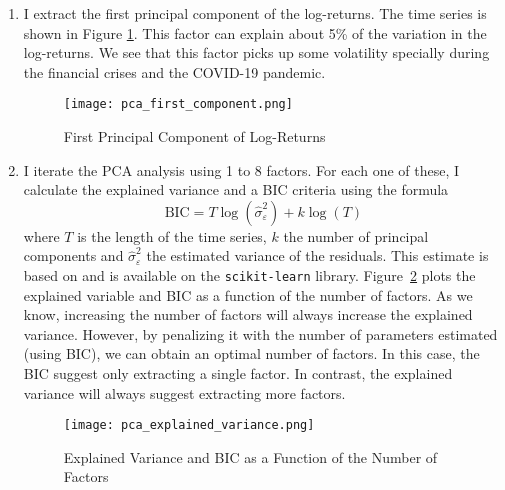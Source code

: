 \begin{solution}
    \begin{enumerate}[label = \Alph*)]
        \item I extract the first principal component of the log-returns. The time series is shown in Figure \ref{fig:pca_time_series}. This factor can explain about 5\% of the variation in the log-returns. We see that this factor picks up some volatility specially during the financial crises and the COVID-19 pandemic.
        
        \begin{figure}[!htbp]
            \begin{small}
                \begin{center}
                    \texttt{[image: pca\_first\_component.png]}
                \end{center}
                \caption{First Principal Component of Log-Returns}
                \label{fig:pca_time_series}
            \end{small}
        \end{figure}
        
        \item I iterate the PCA analysis using 1 to 8 factors. For each one of these, I calculate the explained variance and a BIC criteria using the formula
        \begin{equation}
            \text{BIC} = T\log(\widehat\sigma_\varepsilon^2) + k \log(T)
        \end{equation}
        where \(T\) is the length of the time series, \(k\) the number of principal components and \(\widehat\sigma_\varepsilon^2\) the estimated variance of the residuals. This estimate is based on \citet{bishop2006pattern} and is available on the \texttt{scikit-learn} library. Figure~\ref{fig:pca_crit} plots the explained variable and BIC as a function of the number of factors. As we know, increasing the number of factors will always increase the explained variance. However, by penalizing it with the number of parameters estimated (using BIC), we can obtain an optimal number of factors. In this case, the BIC suggest only extracting a single factor. In contrast, the explained variance will always suggest extracting more factors.

        \begin{figure}[!htbp]
            \begin{small}
                \begin{center}
                    \texttt{[image: pca\_explained\_variance.png]}
                \end{center}
                \caption{Explained Variance and BIC as a Function of the Number of Factors}
                \label{fig:pca_crit}
            \end{small}
        \end{figure}
        

\end{enumerate}
\end{solution}

